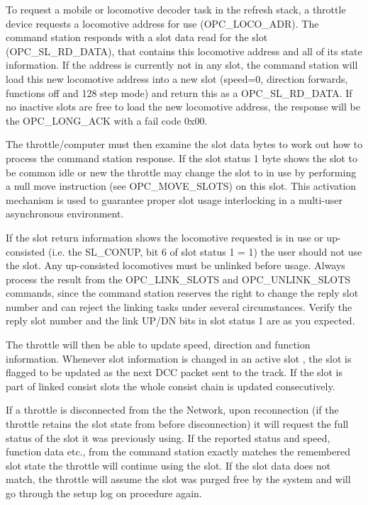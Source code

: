To request a mobile or locomotive decoder task in the refresh stack, a throttle device requests a locomotive address for use (OPC\_LOCO\_ADR). The command station responds with a slot data read for the slot (OPC\_SL\_RD\_DATA), that contains this locomotive address and all of its state information. If the address is currently not in any slot, the command station will load this new locomotive address into a new slot (speed=0, direction forwards, functions off and 128 step mode) and return this as a OPC\_SL\_RD\_DATA. If no inactive slots are free to load the new locomotive address, the response will be the OPC\_LONG\_ACK with a fail code 0x00.

The throttle/computer must then examine the slot data bytes to work out how to process the command station response. If the slot status 1 byte shows the slot to be common idle or new the throttle may change the slot to in use by performing a null move instruction (see OPC\_MOVE\_SLOTS) on this slot. This activation mechanism is used to guarantee proper slot usage interlocking in a multi-user asynchronous environment.

If the slot return information shows the locomotive requested is in use or up-consisted (i.e. the SL\_CONUP, bit 6 of slot status 1 = 1) the user should not use the slot. Any up-consisted locomotives must be unlinked before usage. Always process the result from the OPC\_LINK\_SLOTS and OPC\_UNLINK\_SLOTS commands, since the command station reserves the right to change the reply slot number and can reject the linking tasks under several circumstances. Verify the reply slot number and the link UP/DN bits in slot status 1 are as you expected.

The throttle will then be able to update speed, direction and function information. Whenever slot information is changed in an active slot , the slot is flagged to be updated as the next DCC packet sent to the track. If the slot is part of linked consist slots the whole consist chain is updated consecutively.

If a throttle is disconnected from the the Network, upon reconnection (if the throttle retains the slot state from before disconnection) it will request the full status of the slot it was previously using. If the reported status and speed, function data etc., from the command station exactly matches the remembered slot state the throttle will continue using the slot. If the slot data does not match, the throttle will assume the slot was purged free by the system and will go through the setup log on procedure again.

